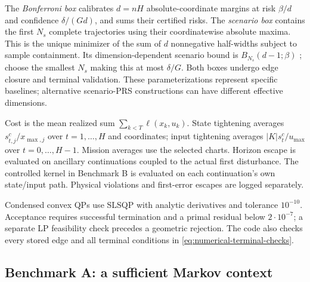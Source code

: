 The \emph{Bonferroni box} calibrates $d=nH$ absolute-coordinate margins at risk $\beta/d$ and confidence $\delta/(Gd)$, and sums their certified risks. The \emph{scenario box} contains the first $N_s$ complete trajectories using their coordinatewise absolute maxima. This is the unique minimizer of the sum of $d$ nonnegative half-widths subject to sample containment. Its dimension-dependent scenario bound is $B_{N_s}(d-1;\beta)$ \citep{CampiGaratti2008}; choose the smallest $N_s$ making this at most $\delta/G$. Both boxes undergo edge closure and terminal validation. These parameterizations represent specific baselines; alternative scenario-PRS constructions can have different effective dimensions.

Cost is the mean realized sum $\sum_{k<T}\ell(x_k,u_k)$. State tightening averages $s_{t,j}^c/x_{\max,j}$ over $t=1,\ldots,H$ and coordinates; input tightening averages $|K|s_t^c/u_{\max}$ over $t=0,\ldots,H-1$. Mission averages use the selected charts. Horizon escape is evaluated on ancillary continuations coupled to the actual first disturbance. The controlled kernel in Benchmark B is evaluated on each continuation's own state/input path. Physical violations and first-error escapes are logged separately.

Condensed convex QPs use SLSQP with analytic derivatives and tolerance $10^{-10}$. Acceptance requires successful termination and a primal residual below $2\cdot10^{-7}$; a separate LP feasibility check precedes a geometric rejection. The code also checks every stored edge and all terminal conditions in \eqref{eq:numerical-terminal-checks}.

\subsection{Benchmark A: a sufficient Markov context}
\label{subsec:numeric-A}

